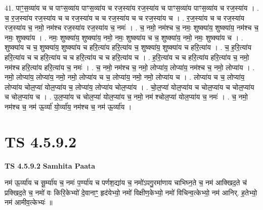 \documentclass[17pt]{extarticle}
\begin{document}
41. पाꣳ॒॒स॒व्या॑य च च पाꣳस॒व्या॑य पाꣳस॒व्या॑य च रज॒स्या॑य रज॒स्या॑य च पाꣳस॒व्या॑य पाꣳस॒व्या॑य च रज॒स्या॑य । . च॒ र॒ज॒स्या॑य रज॒स्या॑य च च रज॒स्या॑य च च रज॒स्या॑य च च रज॒स्या॑य च । . र॒ज॒स्या॑य च च रज॒स्या॑य रज॒स्या॑य च॒ नमो॒ नम॑श्च रज॒स्या॑य रज॒स्या॑य च॒ नमः॑ । . च॒ नमो॒ नम॑श्च च॒ नमः॒ शुष्क्या॑य॒ शुष्क्या॑य॒ नम॑श्च च॒ नमः॒ शुष्क्या॑य । . नमः॒ शुष्क्या॑य॒ शुष्क्या॑य॒ नमो॒ नमः॒ शुष्क्या॑य च च॒ शुष्क्या॑य॒ नमो॒ नमः॒ शुष्क्या॑य च । . शुष्क्या॑य च च॒ शुष्क्या॑य॒ शुष्क्या॑य च हरि॒त्या॑य हरि॒त्या॑य च॒ शुष्क्या॑य॒ शुष्क्या॑य च हरि॒त्या॑य । . च॒ ह॒रि॒त्या॑य हरि॒त्या॑य च च हरि॒त्या॑य च च हरि॒त्या॑य च च हरि॒त्या॑य च । . ह॒रि॒त्या॑य च च हरि॒त्या॑य हरि॒त्या॑य च॒ नमो॒ नम॑श्च हरि॒त्या॑य हरि॒त्या॑य च॒ नमः॑ । . च॒ नमो॒ नम॑श्च च॒ नमो॒ लोप्या॑य॒ लोप्या॑य॒ नम॑श्च च॒ नमो॒ लोप्या॑य । . नमो॒ लोप्या॑य॒ लोप्या॑य॒ नमो॒ नमो॒ लोप्या॑य च च॒ लोप्या॑य॒ नमो॒ नमो॒ लोप्या॑य च । . लोप्या॑य च च॒ लोप्या॑य॒ लोप्या॑य चोल॒प्या॑ योल॒प्या॑य च॒ लोप्या॑य॒ लोप्या॑य चोल॒प्या॑य । . चो॒ल॒प्या॑ योल॒प्या॑य च चोल॒प्या॑य च चोल॒प्या॑य च चोल॒प्या॑य च । . उ॒ल॒प्या॑य च चोल॒प्या॑ योल॒प्या॑य च॒ नमो॒ नम॑ श्चोल॒प्या॑ योल॒प्या॑य च॒ नमः॑ । . च॒ नमो॒ नम॑श्च च॒ नम॑ ऊ॒र्व्या॑ यो॒र्व्या॑य॒ नम॑श्च च॒ नम॑ ऊ॒र्व्या॑य । \newline
\pagebreak
{}

\section{ TS 4.5.9.2 }

\textbf{TS 4.5.9.2 } \newline
\textbf{Samhita Paata} \newline

नम॑ ऊ॒र्व्या॑य च सू॒र्म्या॑य च॒ नमः॑ प॒र्ण्या॑य च पर्णश॒द्या॑य च॒ नमो॑ऽपगु॒रमा॑णाय चाभिघ्न॒ते च॒ नम॑ आक्खिद॒ते च॑ प्रक्खिद॒ते च॒ नमो॑ वः किरि॒केभ्यो॑ दे॒वानाꣳ॒॒ हृद॑येभ्यो॒ नमो॑ विक्षीण॒केभ्यो॒ नमो॑ विचिन्व॒त्केभ्यो॒ नम॑ आनिर्. ह॒तेभ्यो॒ नम॑ आमीव॒त्केभ्यः॑ ॥ \newline
\end{document}
